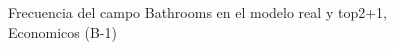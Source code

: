 \begin{figure}[H]
    \centering
    
    \caption{Frecuencia del campo Bathrooms en el modelo real y top2+1, Economicos (B-1)}
    \label{frecuency-Bathrooms-top2+1}
\end{figure}